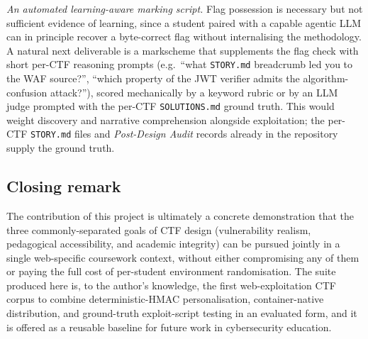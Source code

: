 \textit{An automated learning-aware marking script.} Flag
possession is necessary but not sufficient evidence of
learning, since a student paired with a capable agentic LLM
can in principle recover a byte-correct flag without
internalising the methodology. A natural next deliverable is a
markscheme that supplements the flag check with short per-CTF
reasoning prompts (e.g.\ ``what \texttt{STORY.md} breadcrumb
led you to the WAF source?'', ``which property of the JWT
verifier admits the algorithm-confusion attack?''), scored
mechanically by a keyword rubric or by an LLM judge
prompted with the per-CTF \texttt{SOLUTIONS.md} ground truth.
This would weight discovery and narrative comprehension
alongside exploitation; the per-CTF \texttt{STORY.md} files
and \textit{Post-Design Audit} records already in the
repository supply the ground truth.

\subsection{Closing remark}

The contribution of this project is ultimately a concrete
demonstration that the three commonly-separated goals of CTF
design (vulnerability realism, pedagogical accessibility, and
academic integrity) can be pursued jointly in a single web-specific
coursework context, without either compromising any of them or
paying the full cost of per-student environment randomisation. The
suite produced here is, to the author's knowledge, the first
web-exploitation CTF corpus to combine
deterministic-HMAC personalisation, container-native distribution,
and ground-truth exploit-script testing in an evaluated form, and
it is offered as a reusable baseline for future work in
cybersecurity education.
